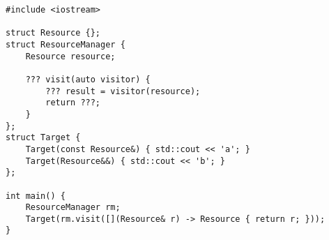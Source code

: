 \begin{lstlisting}[title=\href{https://godbolt.org/z/T638sY}{\texttt{godbolt.org/z/T638sY}}]
#include <iostream>

struct Resource {};
struct ResourceManager {
    Resource resource;

    ??? visit(auto visitor) {
        ??? result = visitor(resource);
        return ???;
    }
};
struct Target {
    Target(const Resource&) { std::cout << 'a'; }
    Target(Resource&&) { std::cout << 'b'; }
};

int main() {
    ResourceManager rm;
    Target(rm.visit([](Resource& r) -> Resource { return r; }));
}
\end{lstlisting}
